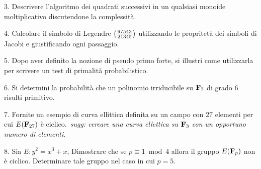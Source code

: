 \item{3.} Descrivere l'algoritmo dei quadrati successivi in un qualsiasi monoide moltiplicativo discutendone la complessit\`a.\vv

\item{4.} Calcolare il simbolo di Legendre $\left({97543\over 21345}\right)$ utilizzando le propritet\`a dei simboli di Jacobi e giustificando
ogni passaggio.\ve\vs

\item{5.} Dopo aver definito la nozione di pseudo primo forte, si illustri come utilizzarla per scrivere un test di primalit\`a 
probabilistico.\vv

\item{6.} Si determini la probabilit\`a che un polinomio irriducibile su ${\bf F}_7$ di grado $6$ risulti primitivo.\ve\vs

\item{7.} Fornite un esempio di curva ellittica definita su un campo con $27$ elementi per cui $E({\bf F}_{27})$ \`e
ciclico.\hfill \break \ \hfill {\it sugg: cercare una curva ellettica su ${\bf F}_{3}$ con un opportuno numero di elementi}.\vv

\item{8.} Sia $E: y^2=x^3+x$,  Dimostrare che se $p\equiv1\bmod4$ allora il gruppo $E({\bf F}_p)$ non \`e ciclico.
Determinare tale gruppo nel caso in cui $p=5$.%

 
\bye
